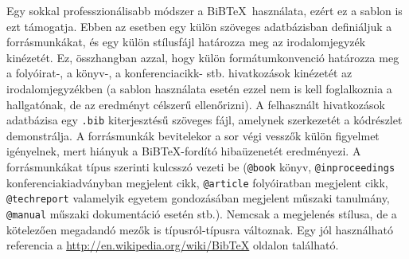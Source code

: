 Egy sokkal professzionálisabb módszer a BiB\TeX~használata, ezért ez a sablon is ezt támogatja. Ebben az esetben egy külön szöveges adatbázisban definiáljuk a forrásmunkákat, és egy külön stílusfájl határozza meg az irodalomjegyzék kinézetét. Ez, összhangban azzal, hogy külön formátumkonvenció határozza meg a folyóirat-, a könyv-, a konferenciacikk- stb. hivatkozások kinézetét az irodalomjegyzékben (a sablon használata esetén ezzel nem is kell foglalkoznia a hallgatónak, de az eredményt célszerű ellenőrizni). A felhasznált hivatkozások adatbázisa egy \verb+.bib+ kiterjesztésű szöveges fájl, amelynek szerkezetét a  kódrészlet demonstrálja. A forrásmunkák bevitelekor a sor végi vesszők külön figyelmet igényelnek, mert hiányuk a BiB\TeX-fordító hibaüzenetét eredményezi. A forrásmunkákat típus szerinti kulcsszó vezeti be (\verb+@book+ könyv, \verb+@inproceedings+ konferenciakiadványban megjelent cikk, \verb+@article+ folyóiratban megjelent cikk, \verb+@techreport+ valamelyik egyetem gondozásában megjelent műszaki tanulmány, \verb+@manual+ műszaki dokumentáció esetén stb.). Nemcsak a megjelenés stílusa, de a kötelezően megadandó mezők is típusról-típusra változnak. Egy jól használható referencia a \url{http://en.wikipedia.org/wiki/BibTeX} oldalon található.

